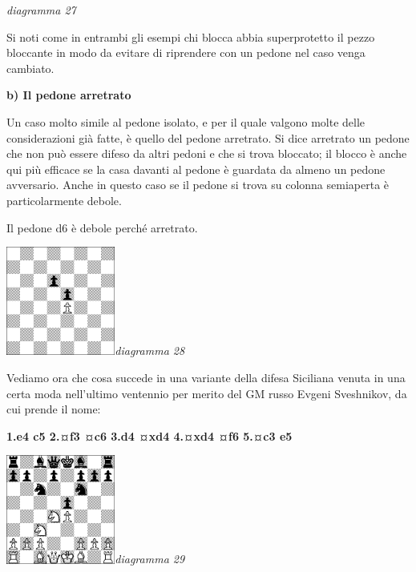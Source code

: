 \documentclass[
]{article}
\begin{document}
\emph{diagramma 27}

Si noti come in entrambi gli esempi chi blocca abbia superprotetto il
pezzo bloccante in modo da evitare di riprendere con un pedone nel caso
venga cambiato.

\textbf{b) Il pedone arretrato}

Un caso molto simile al pedone isolato, e per il quale valgono molte
delle considerazioni già fatte, è quello del pedone arretrato. Si dice
arretrato un pedone che non può essere difeso da altri pedoni e che si
trova bloccato; il blocco è anche qui più efficace se la casa davanti al
pedone è guardata da almeno un pedone avversario. Anche in questo caso
se il pedone si trova su colonna semiaperta è particolarmente debole.

Il pedone d6 è debole perché arretrato.

\includegraphics[width=1.40972in,height=1.40972in]{vertopal_109f12be458a423d8f3cc838880eaea2/media/image28.png}\emph{diagramma
28}

Vediamo ora che cosa succede in una variante della difesa Siciliana
venuta in una certa moda nell'ultimo ventennio per merito del GM russo
Evgeni Sveshnikov, da cui prende il nome:

\textbf{1.e4 c5 2.¤f3 ¤c6 3.d4 ¤xd4 4.¤xd4 ¤f6 5.¤c3 e5}

\includegraphics[width=1.40972in,height=1.40972in]{vertopal_109f12be458a423d8f3cc838880eaea2/media/image29.png}\emph{diagramma
29}
\end{document}
